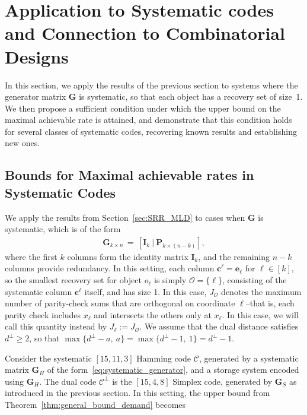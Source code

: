 \documentclass[conference,letterpaper]{IEEEtran}
\begin{document}
\section{Application to Systematic codes and Connection to Combinatorial Designs}\label{sec:Systematic}
In this section, we apply the results of the previous section to systems where the generator matrix \( \boldsymbol{G} \) is systematic, so that each object has a recovery set of size~1. We then propose a sufficient condition under which the upper bound on the maximal achievable rate is attained, and demonstrate that this condition holds for several classes of systematic codes, recovering known results and establishing new ones.

\subsection{Bounds for Maximal achievable rates in Systematic Codes}

We apply the results from Section~\ref{sec:SRR_MLD} to cases when $\boldsymbol{G}$ is systematic, which is of the form
\begin{align}\label{eq:systematic_generator}
    \boldsymbol{G}_{k\times n} \,=\, \left[\boldsymbol{I}_{k} \ |\ \boldsymbol{P}_{k\times (n-k)}\right],
\end{align}
where the first $k$ columns form the identity matrix $\boldsymbol{I}_k$, and the remaining $n-k$ columns provide redundancy. In this setting, each column \( \boldsymbol{c}^{\ell} = \boldsymbol{e}_{\ell} \) for \( \ell \in [k] \), so the smallest recovery set for object \( o_{\ell} \) is simply \( \mathcal{O} = \{\ell\} \), consisting of the systematic column \( \boldsymbol{c}^{\ell} \) itself, and has size 1. In this case, \( J_{\mathcal{O}} \) denotes the maximum number of parity-check sums that are orthogonal on coordinate \( \ell \)--that is, each parity check includes \( x_\ell \) and intersects the others only at \( x_\ell \). In this case, we will call this quantity instead by \( J_{\ell} := J_{\mathcal{O}} \). We assume that the dual distance satisfies \( d^{\perp} \ge 2 \), so that \( \max\{d^{\perp} - a,\ a\} = \max\{d^{\perp} - 1,\ 1\} = d^{\perp} - 1 \).

Consider the systematic \( [15, 11, 3] \) Hamming code \( \mathcal{C} \), generated by a systematic matrix \( \boldsymbol{G}_H \) of the form~\eqref{eq:systematic_generator}, and a storage system encoded using \( \boldsymbol{G}_H \). The dual code \( \mathcal{C}^\perp \) is the \( [15, 4, 8] \) Simplex code, generated by \( \boldsymbol{G}_S \) as introduced in the previous section. In this setting, the upper bound from Theorem~\ref{thm:general_bound_demand} becomes
\end{document}
